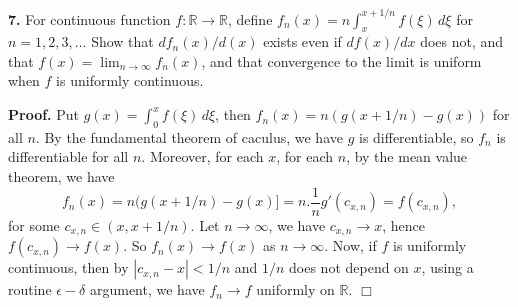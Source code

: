 \documentclass{article}
\begin{document}
    \textbf{7.} For continuous function $f:\mathbb{R} \to \mathbb{R}$,
define $f_n(x) = n\int_x^{x+1/n}f(\xi)\,d\xi$ for $n=1,2,3,\ldots$ Show
that $df_n(x)/d(x)$ exists even if $df(x)/dx$ does not, and that
$f(x) = \lim_{n\to \infty}f_n(x)$, and that convergence to the limit is
uniform when $f$ is uniformly continuous.

    \textbf{Proof.} Put $g(x) = \int_0^x f(\xi)\,d\xi$, then
$f_n(x) = n(g(x+1/n)-g(x))$ for all $n$. By the fundamental theorem of
caculus, we have $g$ is differentiable, so $f_n$ is differentiable for
all $n$. Moreover, for each $x$, for each $n$, by the mean value
theorem, we have
\[f_n(x)  =n(g(x+1/n) -g(x)] = n.\frac{1}{n}g'(c_{x,n}) = f(c_{x,n}),\]
for some $c_{x,n}\in (x, x+1/n)$. Let $n\to \infty$, we have
$c_{x,n} \to x$, hence $f(c_{x,n}) \to f(x)$. So $f_n(x) \to f(x)$ as
$n\to\infty$. Now, if $f$ is uniformly continuous, then by
$|c_{x,n} - x| < 1/n$ and $1/n$ does not depend on $x$, using a routine
$\epsilon-\delta$ argument, we have $f_n \to f$ uniformly on
$\mathbb{R}$. $\Box$


    
    
    
    
\end{document}
